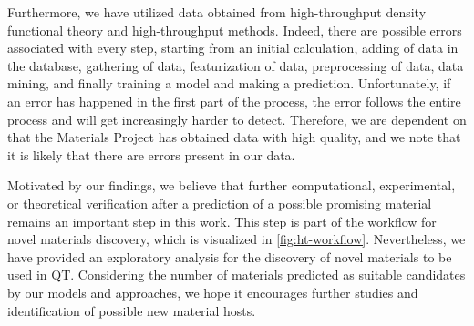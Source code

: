 Furthermore, we have utilized data obtained from high-throughput density functional theory and high-throughput methods. Indeed, there are possible errors associated with every step, starting from an initial calculation, adding of data in the database, gathering of data, featurization of data, preprocessing of data, data mining, and finally training a model and making a prediction. Unfortunately, if an error has happened in the first part of the process, the error follows the entire process and will get increasingly harder to detect. Therefore, we are dependent on that the Materials Project has obtained data with high quality, and we note that it is likely that there are errors present in our data. %

Motivated by our findings, we believe that further computational, experimental, or theoretical verification after a prediction of a possible promising material remains an important step in this work. This step is part of the workflow for novel materials discovery, which is visualized in \autoref{fig:ht-workflow}. Nevertheless, we have provided an exploratory analysis for the discovery of novel materials to be used in QT. Considering the number of materials predicted as suitable candidates by our models and approaches, we hope it encourages further studies and identification of possible new material hosts.

